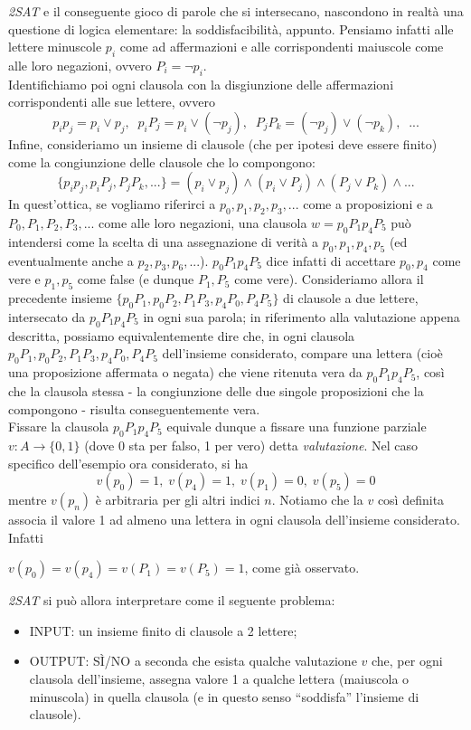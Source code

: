 \documentclass[12pt,a4paper]{report}
\theoremstyle{definition}
\begin{document}
\emph{2SAT} e il conseguente gioco di parole che si intersecano, nascondono in realtà una questione di logica elementare: la soddisfacibilità, appunto. Pensiamo infatti alle lettere minuscole $p_i$ come ad affermazioni e alle corrispondenti maiuscole come alle loro negazioni, ovvero $P_i = \neg p_i$.\\
Identifichiamo poi ogni clausola con la disgiunzione delle affermazioni corrispondenti alle sue lettere, ovvero
$$p_i p_j = p_i \vee p_j, \; \; p_i P_j = p_i \vee (\neg p_j), \; \; P_j P_k = (\neg p_j) \vee (\neg p_k), \; \;...$$
Infine, consideriamo un insieme di clausole (che per ipotesi deve essere finito) come la congiunzione delle clausole che lo compongono:
$$\{p_i p_j, p_i P_j, P_j P_k, ...\} = (p_i \vee p_j) \wedge (p_i \vee P_j) \wedge (P_j \vee P_k) \wedge ...$$
In quest'ottica, se vogliamo riferirci a $p_0, p_1, p_2, p_3,...$ come a proposizioni e a $P_0, P_1, P_2, P_3,...$ come alle loro negazioni, una clausola $w= p_0 P_1 p_4 P_5$ può intendersi come la scelta di una assegnazione di verità a $p_0, p_1, p_4, p_5$ (ed eventualmente anche a $p_2, p_3, p_6,...$). $p_0 P_1 p_4 P_5$ dice infatti di accettare $p_0, p_4$ come vere e $p_1, p_5$ come false (e dunque $P_1, P_5$ come vere). Consideriamo allora il precedente insieme $\{p_0 P_1, p_0 P_2, P_1 P_3, p_4 P_0, P_4 P_5\}$ di clausole a due lettere, intersecato da $p_0 P_1 p_4 P_5$ in ogni sua parola; in riferimento alla valutazione appena descritta, possiamo equivalentemente dire che, in ogni clausola $p_0 P_1, p_0 P_2, P_1 P_3, p_4 P_0, P_4 P_5$ dell'insieme considerato, compare una lettera (cioè una proposizione affermata o negata) che viene ritenuta vera da $p_0 P_1 p_4 P_5$, così che la clausola stessa - la congiunzione delle due singole proposizioni che la compongono - risulta conseguentemente vera.\\
Fissare la clausola $p_0 P_1 p_4 P_5$ equivale dunque a fissare una funzione parziale $v: A \longrightarrow \{0,1\}$ (dove 0 sta per falso, 1 per vero) detta \emph{valutazione}. Nel caso specifico dell'esempio ora considerato, si ha
$$v(p_0) = 1, \; v(p_4) = 1, \; v(p_1) = 0, \; v(p_5) = 0$$
mentre $v(p_n)$ è arbitraria per gli altri indici $n$. Notiamo che la $v$ così definita associa il valore 1 ad almeno una lettera in ogni clausola dell'insieme considerato. Infatti\\
\centerline{$v(p_0) = v(p_4) = v(P_1) = v(P_5) = 1$, come già osservato.}
\emph{2SAT} si può allora interpretare come il seguente problema:
\begin{itemize}
\item INPUT: un insieme finito di clausole a 2 lettere;
\item OUTPUT: SÌ/NO a seconda che esista qualche valutazione $v$ che, per ogni clausola dell'insieme, assegna valore 1 a qualche lettera (maiuscola o minuscola) in quella clausola (e in questo senso ``soddisfa'' l'insieme di clausole).
\end{itemize}
\end{document}
